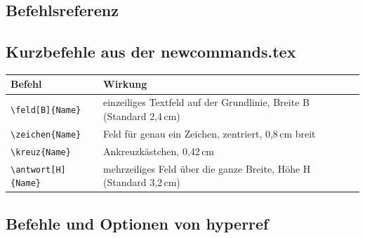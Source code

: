 \begin{Form}
\section{Befehlsreferenz}

\subsection{Kurzbefehle aus der newcommands.tex}

\renewcommand{\arraystretch}{1.3}
\begin{tabular}{p{5.6cm} p{10cm}}
	\toprule
	\textbf{Befehl} & \textbf{Wirkung} \\
	\midrule
	\verb|\feld[B]{Name}| & einzeiliges Textfeld auf der Grundlinie, Breite B (Standard 2,4\,cm) \\
	\verb|\zeichen{Name}| & Feld für genau ein Zeichen, zentriert, 0,8\,cm breit \\
	\verb|\kreuz{Name}| & Ankreuzkästchen, 0,42\,cm \\
	\verb|\antwort[H]{Name}| & mehrzeiliges Feld über die ganze Breite, Höhe H (Standard 3,2\,cm) \\
	\bottomrule
\end{tabular}

\subsection{Befehle und Optionen von hyperref}


\end{Form}
